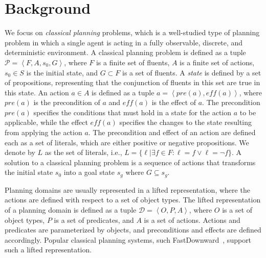 \documentclass{article}
\theoremstyle{definition}
\theoremstyle{remark}
\newcommand{\tuple}[1]{\ensuremath{\left \langle #1 \right \rangle }}
\newif\ifaddcomments
\newcommand{\roni}[1]{\ifaddcomments{\textcolor{red}{[Roni: #1]}}\fi}
\begin{document}
\section{Background}

We focus on \emph{classical planning} problems, which is a well-studied type of planning problem in which a single agent is acting in a fully observable, discrete, and deterministic environment. 
A classical planning problem is defined as a tuple $\mathcal{P} = \tuple{F, A, s_0, G}$, where $F$ is a finite set of fluents, $A$ is a finite set of actions, $s_0 \in S$ is the initial state, and $G\subset F$ is a set of fluents. \roni{For all: I modified the above definition to:(1) not have $S$ as the set of states but have $F$ as the set of fluents, and (2) not have $G$ as a set of states but as a subset of fluents (that must be achieved). If anyone objects please do not change but rather comment here on the change you would like and why.}
A \emph{state} is defined by a set of propositions, representing that the conjunction of fluents in this set are true in this state.
An action $a\in A$ is defined as a tuple $a = \tuple{\mathit{pre}(a), \mathit{eff}(a)}$, where $\mathit{pre}(a)$ is the precondition of $a$ and $\mathit{eff}(a)$ is the effect of $a$. 
The precondition $\mathit{pre}(a)$ specifies the conditions that must hold in a state for the action $a$ to be applicable, while the effect $\mathit{eff}(a)$ specifies the changes to the state resulting from applying the action $a$.   
The precondition and effect of an action are defined each as a set of literals, which are either positive or negative propositions. We denote by $L$ as the set of literals, i.e., $L=\{\ell | \exists f\in F: \ell=f \vee \ell=\neg f\}$. \roni{Not sure about the }
A solution to a classical planning problem is a sequence of actions that transforms the initial state $s_0$ into a goal state $s_g$ where $G\subseteq s_g$. \roni{Minor modification to goal state to reflect the change above}


Planning domains are usually represented in a lifted representation, where the actions are defined with respect to a set of object types.
The lifted representation of a planning domain is defined as a tuple $\mathcal{D} = \tuple{O, P, A}$, where $O$ is a set of object types, $P$ is a set of predicates, and $A$ is a set of actions. Actions and predicates are parameterized by objects, and preconditions and effects are defined accordingly. 
Popular classical planning systems, such FastDownward~\citep{helmert2006fast}, support such a lifted representation. 
\end{document}
